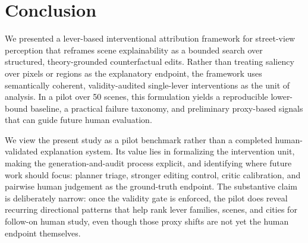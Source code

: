 \section{Conclusion}

We presented a lever-based interventional attribution framework for
street-view perception that reframes scene explainability as a bounded
search over structured, theory-grounded counterfactual edits. Rather
than treating saliency over pixels or regions as the explanatory
endpoint, the framework uses semantically coherent, validity-audited
single-lever interventions as the unit of analysis. In a pilot over 50
scenes, this formulation yields a reproducible lower-bound baseline, a
practical failure taxonomy, and preliminary proxy-based signals that can
guide future human evaluation.

We view the present study as a pilot benchmark rather than a completed
human-validated explanation system. Its value lies in formalizing the
intervention unit, making the generation-and-audit process explicit, and
identifying where future work should focus: planner triage, stronger
editing control, critic calibration, and pairwise human judgement as
the ground-truth endpoint. The substantive claim is deliberately narrow:
once the validity gate is enforced, the pilot does reveal recurring
directional patterns that help rank lever families, scenes, and cities
for follow-on human study, even though those proxy shifts are not yet
the human endpoint themselves.
